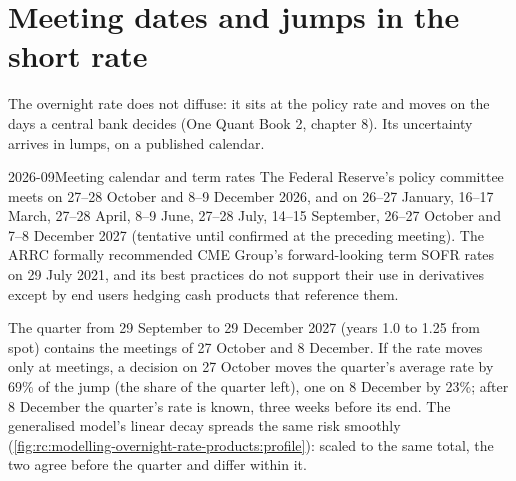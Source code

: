 \section{Meeting dates and jumps in the short rate}

The overnight rate does not diffuse: it sits at the policy rate and moves on the
days a central bank decides (One Quant Book 2, chapter 8). Its uncertainty
arrives in lumps, on a published calendar.

\begin{dated}{2026-09}{Meeting calendar and term rates}\label{dat:rc:modelling-overnight-rate-products:term}
The Federal Reserve's policy committee meets on 27--28 October and 8--9 December
2026, and on 26--27 January, 16--17 March, 27--28 April, 8--9 June, 27--28 July,
14--15 September, 26--27 October and 7--8 December 2027 (tentative until confirmed
at the preceding meeting). The ARRC formally recommended CME Group's forward-looking
term SOFR rates on 29 July 2021, and its best practices do not support their use in
derivatives except by end users hedging cash products that reference them.
\end{dated}

\label{lst:rc:modelling-overnight-rate-products:meetings}

\begin{example}\label{ex:rc:modelling-overnight-rate-products:meetings}
The quarter from 29 September to 29 December 2027 (years 1.0 to 1.25 from spot)
contains the meetings of 27 October and 8 December. If the rate moves only at
meetings, a decision on 27 October moves the quarter's average rate by 69\% of the
jump (the share of the quarter left), one on 8 December by 23\%; after 8 December the
quarter's rate is known, three weeks before its end. The generalised model's linear
decay spreads the same risk smoothly
(\cref{fig:rc:modelling-overnight-rate-products:profile}): scaled to the same total,
the two agree before the quarter and differ within it.
\end{example}

